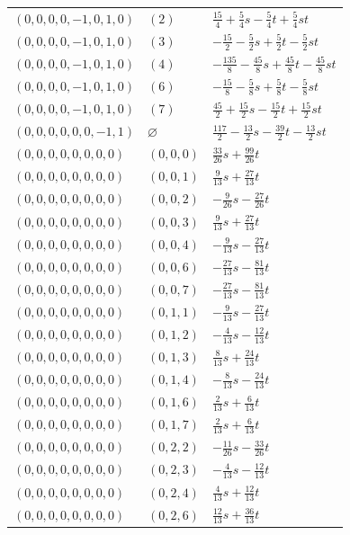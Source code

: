 \begin{longtable}{@{}lll@{}}
$(0,0,0,0,-1,0,1,0)$ & $(2)$ & $\frac{15}{4}+\frac{5}{4}s-\frac{5}{4}t+\frac{5}{4}st$\\
$(0,0,0,0,-1,0,1,0)$ & $(3)$ & $-\frac{15}{2}-\frac{5}{2}s+\frac{5}{2}t-\frac{5}{2}st$\\
$(0,0,0,0,-1,0,1,0)$ & $(4)$ & $-\frac{135}{8}-\frac{45}{8}s+\frac{45}{8}t-\frac{45}{8}st$\\
$(0,0,0,0,-1,0,1,0)$ & $(6)$ & $-\frac{15}{8}-\frac{5}{8}s+\frac{5}{8}t-\frac{5}{8}st$\\
$(0,0,0,0,-1,0,1,0)$ & $(7)$ & $\frac{45}{2}+\frac{15}{2}s-\frac{15}{2}t+\frac{15}{2}st$\\
$(0,0,0,0,0,0,-1,1)$ & $\varnothing$ & $\frac{117}{2}-\frac{13}{2}s-\frac{39}{2}t-\frac{13}{2}st$\\
$(0,0,0,0,0,0,0,0)$ & $(0,0,0)$ & $\frac{33}{26}s+\frac{99}{26}t$\\
$(0,0,0,0,0,0,0,0)$ & $(0,0,1)$ & $\frac{9}{13}s+\frac{27}{13}t$\\
$(0,0,0,0,0,0,0,0)$ & $(0,0,2)$ & $-\frac{9}{26}s-\frac{27}{26}t$\\
$(0,0,0,0,0,0,0,0)$ & $(0,0,3)$ & $\frac{9}{13}s+\frac{27}{13}t$\\
$(0,0,0,0,0,0,0,0)$ & $(0,0,4)$ & $-\frac{9}{13}s-\frac{27}{13}t$\\
$(0,0,0,0,0,0,0,0)$ & $(0,0,6)$ & $-\frac{27}{13}s-\frac{81}{13}t$\\
$(0,0,0,0,0,0,0,0)$ & $(0,0,7)$ & $-\frac{27}{13}s-\frac{81}{13}t$\\
$(0,0,0,0,0,0,0,0)$ & $(0,1,1)$ & $-\frac{9}{13}s-\frac{27}{13}t$\\
$(0,0,0,0,0,0,0,0)$ & $(0,1,2)$ & $-\frac{4}{13}s-\frac{12}{13}t$\\
$(0,0,0,0,0,0,0,0)$ & $(0,1,3)$ & $\frac{8}{13}s+\frac{24}{13}t$\\
$(0,0,0,0,0,0,0,0)$ & $(0,1,4)$ & $-\frac{8}{13}s-\frac{24}{13}t$\\
$(0,0,0,0,0,0,0,0)$ & $(0,1,6)$ & $\frac{2}{13}s+\frac{6}{13}t$\\
$(0,0,0,0,0,0,0,0)$ & $(0,1,7)$ & $\frac{2}{13}s+\frac{6}{13}t$\\
$(0,0,0,0,0,0,0,0)$ & $(0,2,2)$ & $-\frac{11}{26}s-\frac{33}{26}t$\\
$(0,0,0,0,0,0,0,0)$ & $(0,2,3)$ & $-\frac{4}{13}s-\frac{12}{13}t$\\
$(0,0,0,0,0,0,0,0)$ & $(0,2,4)$ & $\frac{4}{13}s+\frac{12}{13}t$\\
$(0,0,0,0,0,0,0,0)$ & $(0,2,6)$ & $\frac{12}{13}s+\frac{36}{13}t$\\

\end{longtable}
